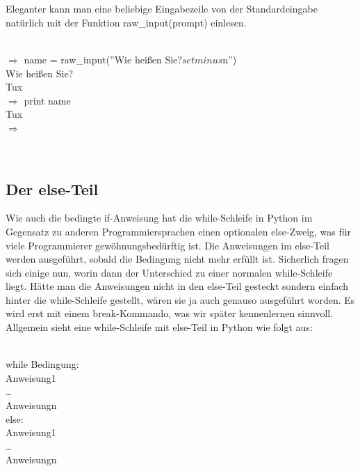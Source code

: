 \\
\\
Eleganter kann man eine beliebige Eingabezeile von der Standardeingabe natürlich mit der Funktion raw\_input(prompt) einlesen. \\
\\
\begin{MyConsoleBox}{
${\Longrightarrow}$ name = raw\_input(''Wie heißen Sie?$setminus$n'') \\
Wie heißen Sie? \\
Tux \\
${\Longrightarrow}$ print name \\
Tux \\
${\Longrightarrow}$ \\
}\end{MyConsoleBox}
\\
\subsection{Der else-Teil}
Wie auch die bedingte if-Anweisung hat die while-Schleife in Python im Gegensatz zu anderen Programmiersprachen einen optionalen else-Zweig, was für viele Programmierer gewöhnungsbedürftig ist.
Die Anweisungen im else-Teil werden ausgeführt, sobald die Bedingung nicht mehr erfüllt ist. Sicherlich fragen sich einige nun, worin dann der Unterschied zu einer normalen while-Schleife liegt. Hätte man die Anweisungen nicht in den else-Teil gesteckt sondern einfach hinter die while-Schleife gestellt, wären sie ja auch genauso ausgeführt worden. Es wird erst mit einem break-Kommando, was wir später kennenlernen sinnvoll.
Allgemein sieht eine while-Schleife mit else-Teil in Python wie folgt aus: \\
\\
\begin{MyConsoleBox}{
while Bedingung:          \\
\hspace{0.5cm} Anweisung1 \\
\hspace{0.5cm} \dots      \\
\hspace{0.5cm} Anweisungn \\
else:                     \\
\hspace{0.5cm} Anweisung1 \\
\hspace{0.5cm} \dots      \\
\hspace{0.5cm} Anweisungn \\
}\end{MyConsoleBox}

